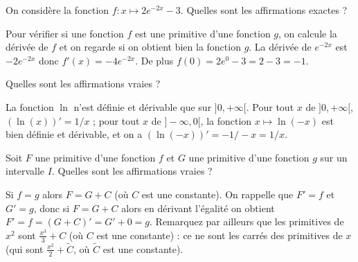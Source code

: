 \begin{question}
On considère la fonction \(f:x\mapsto 2 e^{-2x}-3\). Quelles sont les affirmations exactes ?
\begin{answers}  
\end{answers}
\begin{explanations}
Pour vérifier si une fonction \(f\) est une primitive d'une fonction \(g\), on calcule la dérivée de  \(f\) et on regarde si on obtient bien la fonction \(g\). La dérivée de $ e^{-2x}$ est $-2 e^{-2x}$ donc $f'(x)=-4 e^{-2x}$. De plus $f(0)=2 e^0-3=2-3=-1$.
\end{explanations}
\end{question}


\begin{question}
Quelles sont les affirmations vraies ?
\begin{answers}  
  \bad{$x\mapsto \ln(x)$ est une primitive de $x\mapsto 1/x$ sur $]-\infty,0[$.}
  \good{$x\mapsto \ln(x)$ est une primitive de $x\mapsto 1/x$ sur $]0,+\infty[$.}
  \good{$x\mapsto \ln(-x)$ est une primitive de $x\mapsto 1/x$ sur $]-\infty,0[$.}
\end{answers}
\begin{explanations}
La fonction $\ln$ n'est définie et dérivable que sur $]0,+\infty[$. Pour tout $x$ de $]0,+\infty[$, $(\ln(x))'=1/x$ ; pour tout $x$ de $]-\infty,0[$, la fonction $x \mapsto \ln(-x)$ est bien définie et dérivable, et on a $(\ln(-x))'=-1/-x=1/x$.
\end{explanations}
\end{question}


\begin{question}
Soit $F$ une primitive d'une fonction $f$ et $G$ une primitive d'une fonction $g$ sur un intervalle $I$.
Quelles sont les affirmations vraies ?
\begin{answers}  
\end{answers}
\begin{explanations}
Si $f=g$ alors $F=G+C$ (où $C$ est une constante).
On rappelle que $F'=f$ et $G'=g$, donc si $F=G+C$ alors en dérivant l'égalité on obtient $F'=f = (G+C)'=G'+0=g$. Remarquez par ailleurs que les primitives de $x^2$ sont $\frac{x^3}{3} + C$ (où $C$ est une constante) : ce ne sont les carrés des primitives de $x$ (qui sont $\frac{x^2}{2} + \widetilde{C}$, où $\widetilde{C}$ est une constante).
\end{explanations}
\end{question}


